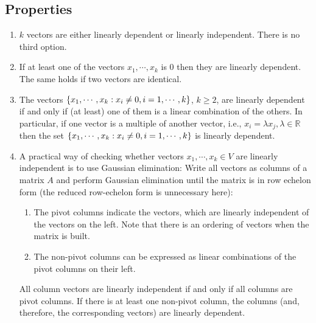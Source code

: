 \subsection{Properties}
\begin{enumerate}
    \item $k$ vectors are either linearly dependent or linearly independent. There is no third option.
    \hfill \cite{mfml/book/mml/Deisenroth-Faisal-Ong}

    \item If at least one of the vectors $x_1, \cdots , x_k$ is $0$ then they are linearly dependent. The same holds if two vectors are identical.
    \hfill \cite{mfml/book/mml/Deisenroth-Faisal-Ong}

    \item The vectors $\left\{x_1, \cdots , x_k : x_i \neq 0, i = 1, \cdots , k\right\}$, $k \geq 2$, are linearly dependent if and only if (at least) one of them is a linear combination of the others. In particular, if one vector is a multiple of another vector, i.e., $x_i = \lambda x_j , \lambda \in \mathbb{R}$ then the set $\left\{x_1, \cdots , x_k : x_i \neq 0, i = 1, \cdots , k\right\}$ is linearly dependent.
    \hfill \cite{mfml/book/mml/Deisenroth-Faisal-Ong}

    \item A practical way of checking whether vectors $x_1, \cdots , x_k \in V$ are linearly independent is to use Gaussian elimination: Write all vectors as columns of a matrix $A$ and perform Gaussian elimination until the matrix is in row echelon form (the reduced row-echelon form is unnecessary here):
    \hfill \cite{mfml/book/mml/Deisenroth-Faisal-Ong}
    \begin{enumerate}
        \item The pivot columns indicate the vectors, which are linearly independent of the vectors on the left. Note that there is an ordering of vectors when the matrix is built.
        \hfill \cite{mfml/book/mml/Deisenroth-Faisal-Ong}

        \item The non-pivot columns can be expressed as linear combinations of the pivot columns on their left.
        \hfill \cite{mfml/book/mml/Deisenroth-Faisal-Ong}
    \end{enumerate}
    All column vectors are linearly independent if and only if all columns are pivot columns. If there is at least one non-pivot column, the columns (and, therefore, the corresponding vectors) are linearly dependent.
    \hfill \cite{mfml/book/mml/Deisenroth-Faisal-Ong}


\end{enumerate}
